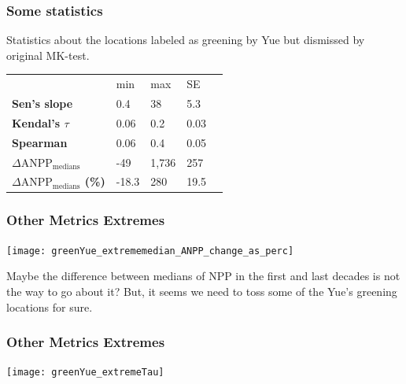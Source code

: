 \documentclass[serif, xcolor={dvipsnames}]{beamer} %
\begin{document}

\begin{frame}
\frametitle{Some statistics}
Statistics about the locations labeled as greening by Yue but dismissed by original MK-test.
\begin{table}[!ht]
\centering
\captionsetup{singlelinecheck=false, format=hang}
\label{tab:Trendcounts}
\begin{tabular}{lllll}
\bottomrule
\rowcolor{shadecolor} 
&  min & max & SE \\ 
\rowcolor{aliceblue} 
\textbf{Sen's slope} & 0.4 & 38 & 5.3 \\
\textbf{Kendal's $\tau$}  & 0.06 & 0.2 &  0.03 \\
\rowcolor{aliceblue} 
\textbf{Spearman}  & 0.06  & 0.4 & 0.05  \\
\textbf{\scriptsize $\Delta \text{ANPP}_{\text{medians}}$} & -49 & 1,736 & 257 \\
\rowcolor{aliceblue}\textbf{\scriptsize $\Delta \text{ANPP}_{\text{medians}}$ (\%)}  & -18.3 & 280 & 19.5 \\
\toprule
\end{tabular}
\end{table}
\end{frame}


\begin{frame}
\frametitle{Other Metrics Extremes}
\begin{center}
\texttt{[image: greenYue\_extrememedian\_ANPP\_change\_as\_perc]}
\end{center}
\vspace{-.2in}
{\scriptsize Maybe the difference between medians of NPP in the first and last decades is not the way to go about it?
But, it seems we need to toss some of the Yue's greening locations for sure.}
\end{frame}
\begin{frame}
\frametitle{Other Metrics Extremes}
\begin{center}
\texttt{[image: greenYue\_extremeTau]}
\end{center}
\end{frame}
\end{document}
